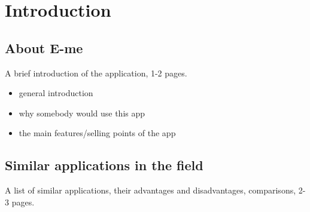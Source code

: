 \chapter{Introduction}\label{ch:INTRO}

\section{About E-me}\label{sec:INTRO:about}
A brief introduction of the application, 1-2 pages.

\begin{itemize}
    \item general introduction
    \item why somebody would use this app
    \item the main features/selling points of the app
\end{itemize}

\section{Similar applications in the field}\label{sec:INTRO:sa}

A list of similar applications, their advantages and disadvantages, comparisons, 2-3 pages.

